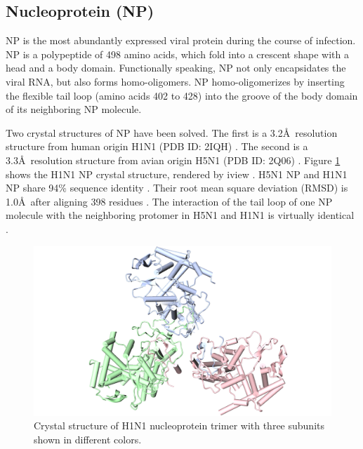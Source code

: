 \subsection{Nucleoprotein (NP)}

NP is the most abundantly expressed viral protein during the course of infection. NP is a polypeptide of 498 amino acids, which fold into a crescent shape with a head and a body domain. Functionally speaking, NP not only encapsidates the viral RNA, but also forms homo-oligomers. NP homo-oligomerizes by inserting the flexible tail loop (amino acids 402 to 428) into the groove of the body domain of its neighboring NP molecule.

Two crystal structures of NP have been solved. The first is a 3.2\AA\ resolution structure from human origin H1N1 (PDB ID: 2IQH) \citep{1140}. The second is a 3.3\AA\ resolution structure from avian origin H5N1 (PDB ID: 2Q06) \citep{1231}. Figure \ref{influenza:2IQH} shows the H1N1 NP crystal structure, rendered by iview \citep{1366}. H5N1 NP and H1N1 NP share 94\% sequence identity \citep{1231}. Their root mean square deviation (RMSD) is 1.0\AA\ after aligning 398 residues \citep{1231}. The interaction of the tail loop of one NP molecule with the neighboring protomer in H5N1 and H1N1 is virtually identical \citep{1231}.

\begin{figure}
\centering
\includegraphics[width=\linewidth]{../influenza/2IQH.png}
\caption{Crystal structure of H1N1 nucleoprotein trimer with three subunits shown in different colors.}
\label{influenza:2IQH}
\end{figure}

